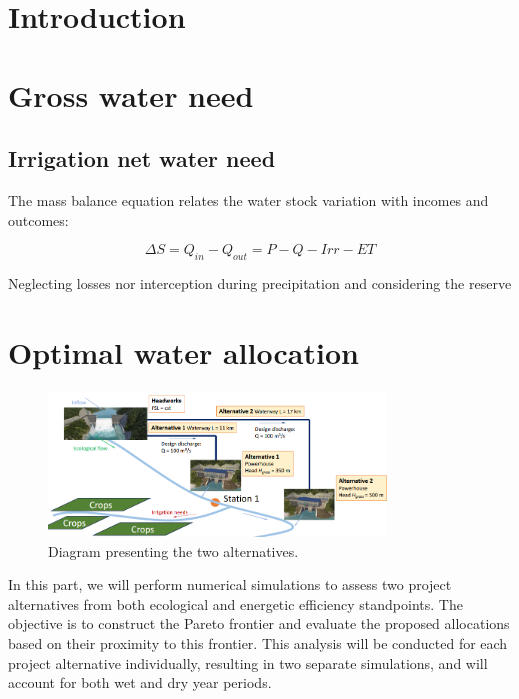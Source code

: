 \documentclass{article}
\begin{document}
\newpage

\section{Introduction}
\newpage
\section{Gross water need}

\subsection{Irrigation net water need}

The mass balance equation relates the water stock variation with incomes and outcomes:

\[
\Delta S = Q_{in} - Q_{out} =  P - Q - Irr - ET
\]

Neglecting losses nor interception during precipitation and considering the reserve 





\section{Optimal water allocation}

\begin{figure}
    \centering
    \includegraphics[width=0.8\textwidth]{images/alternatives_schema.png}
    \caption{Diagram presenting the two alternatives.}
    \label{fig:water-allocation}
\end{figure}

In this part, we will perform numerical simulations to assess two project alternatives from both ecological and energetic efficiency standpoints. The objective is to construct the Pareto frontier and evaluate the proposed allocations based on their proximity to this frontier. This analysis will be conducted for each project alternative individually, resulting in two separate simulations, and will account for both wet and dry year periods.
\end{document}
